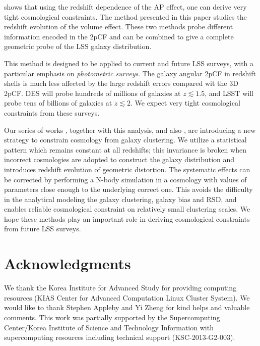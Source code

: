 \documentclass[iop]{emulateapj}
\begin{document}
 

\cite{Li2015,Li2016} shows that using the redshift dependence of the AP effect, 
one can derive very tight cosmological constraints.
The method presented in this paper studies the redshift evolution of the volume effect.
These two methods probe different information encoded in the 2pCF 
and can be combined to give a complete geometric probe of the LSS galaxy distribution.

This method is designed to be applied to current and future LSS surveys,
with a particular emphasis on {\it photometric surveys}.
The galaxy angular 2pCF in redshift shells is much less affected by the large redshift errors compared wit the 3D 2pCF.
DES will probe hundreds of millions of galaxies at $z\lesssim1.5$, 
and LSST will probe tens of billions of galaxies at $z\lesssim2$.
We expect very tight cosmological constraints from these surveys.


Our series of works \cite{Li2014,Li2015,Li2016}, together with this analysis, 
and also \cite{topology,MS2016},
are introducing a new strategy to constrain cosmology from galaxy clustering.
We utilize a statistical pattern which remains constant at all redshifts;
this invariance is broken when incorrect cosmologies are adopted to construct the galaxy distribution
and introduces redshift evolution of geometric distortion.
The systematic effects can be corrected by performing a N-body simulation 
in a cosmology with values of parameters close enough to the underlying correct one.
This avoids the difficulty in the analytical modeling the galaxy clustering, galaxy bias and RSD,
and enables reliable cosmological constraint on relatively small clustering scales.
We hope these methods play an important role in deriving cosmological constraints from future LSS surveys.

 
 
\section*{Acknowledgments}

We thank the Korea Institute for Advanced Study for providing computing resources (KIAS Center for Advanced Computation Linux Cluster System).
We would like to thank Stephen Appleby and Yi Zheng for kind helps and valuable comments.
This work was partially supported by the
Supercomputing Center/Korea Institute of Science and
Technology Information with supercomputing resources
including technical support (KSC-2013-G2-003).
\end{document}
